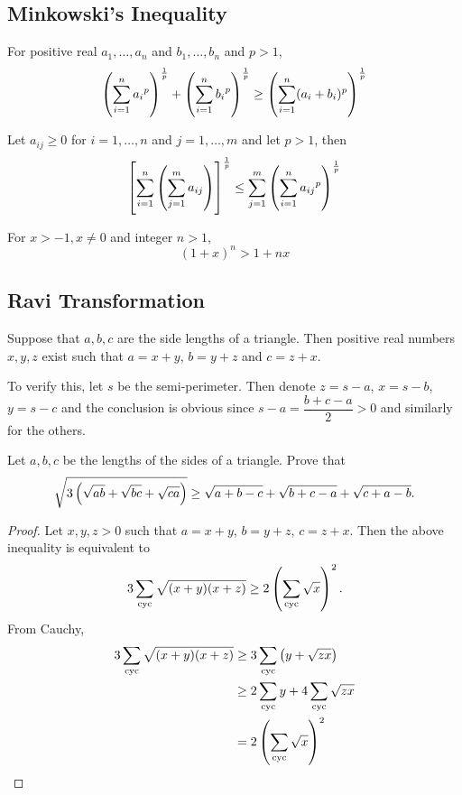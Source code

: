 \subsection{Minkowski's Inequality}
\begin{theorem}
For positive real $a_1,\dots,a_n$ and $b_1,\dots,b_n$ and $p > 1$,
\begin{equation}
\left(\sum_{i=1}^n{a_i}^p\right)^{\frac{1}{p}}+\left(\sum_{i=1}^n{b_i}^p\right)^{\frac{1}{p}} \ge \left(\sum_{i=1}^n(a_i+b_i)^p\right)^{\frac{1}{p}}
\end{equation}
\end{theorem}

\begin{theorem}
Let $a_{ij}\ge0$ for $i=1,\dots,n$ and $j=1,\dots,m$ and let $p>1$, then
\begin{equation}
\left[\sum_{i=1}^n\left(\sum_{j=1}^ma_{ij}\right)\right]^\frac{1}{p} \le \sum_{j=1}^m\left(\sum_{i=1}^n{a_{ij}}^p\right)^\frac{1}{p}
\end{equation}
\end{theorem}

\begin{theorem}
For $x>-1,x\neq0$ and integer $n>1$,
\begin{equation}
(1+x)^n > 1+nx
\end{equation}
\end{theorem}

\subsection{Ravi Transformation}
Suppose that $a, b, c$ are the side lengths of a triangle. Then positive real numbers $x, y, z$ exist such that $a=x+y$, $b=y+z$ and $c=z+x$.

To verify this, let $s$ be the semi-perimeter. Then denote $z=s-a$, $x=s-b$, $y=s-c$ and the conclusion is obvious since $s-a=\dfrac{b+c-a}{2}>0$ and similarly for the others.

\begin{exercise}
Let $a,b,c$ be the lengths of the sides of a triangle. Prove that
\[ \sqrt{3\left(\sqrt{ab}+\sqrt{bc}+\sqrt{ca}\right)}\ge\sqrt{a+b-c}+\sqrt{b+c-a}+\sqrt{c+a-b}. \]
\end{exercise}

\begin{proof}
Let $x,y,z>0$ such that $a=x+y$, $b=y+z$, $c=z+x$. Then the above inequality is equivalent to 
\[ 3\sum_{\mathrm{cyc}}\sqrt{(x+y)(x+z)}\ge2\left(\sum_{\mathrm{cyc}}\sqrt{x}\right)^2. \]
From Cauchy,
\begin{align*}
3\sum_{\mathrm{cyc}}\sqrt{(x+y)(x+z)}
&\ge3\sum_{\mathrm{cyc}}\left(y+\sqrt{zx}\right)\\
&\ge2\sum_{\mathrm{cyc}} y+4\sum_{\mathrm{cyc}}\sqrt{zx}\\
&=2\left(\sum_{\mathrm{cyc}}\sqrt{x}\right)^2
\end{align*}
\end{proof}

